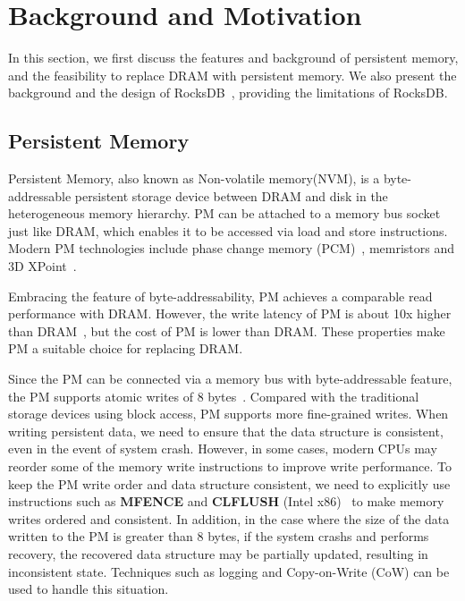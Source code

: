 \section{Background and Motivation}
In this section, we first discuss the features and background of persistent memory, and the feasibility to replace DRAM with persistent memory. We also present the background and the design of RocksDB~\cite{RocksDB}, providing the limitations of RocksDB.
\subsection{Persistent Memory}
Persistent Memory, also known as Non-volatile memory(NVM), is a byte-addressable persistent storage device between DRAM and disk in the heterogeneous memory hierarchy. PM can be attached to a memory bus socket just like DRAM, which enables it to be accessed via load and store instructions. Modern PM technologies include phase change memory (PCM)~\cite{PCM}, memristors and 3D XPoint~\cite{3DXPoint}.

Embracing the feature of byte-addressability, PM achieves a comparable read performance with DRAM. However, the write latency of PM is about 10x higher than DRAM~\cite{DBLP:conf/usenix/XiaJXS17}, but the cost of PM is lower than DRAM. These properties make PM a suitable choice for replacing DRAM.

Since the PM can be connected via a memory bus with byte-addressable feature, the PM supports atomic writes of 8 bytes~\cite{DBLP:conf/fast/LeeLSNN17}. Compared with the traditional storage devices using block access, PM supports more fine-grained writes. When writing persistent data, we need to ensure that the data structure is consistent, even in the event of system crash. However, in some cases, modern CPUs may reorder some of the memory write instructions to improve write performance. To keep the PM write order and data structure consistent, we need to explicitly use instructions such as \textbf{MFENCE} and \textbf{CLFLUSH} (Intel x86)~\cite{SLMDB,DBLP:conf/fast/LeeLSNN17,DBLP:conf/usenix/KannanBGAA18} to make memory writes ordered and consistent. In addition, in the case where the size of the data written to the PM is greater than 8 bytes, if the system crashs and performs recovery, the recovered data structure may be partially updated, resulting in inconsistent state. Techniques such as logging and Copy-on-Write (CoW) can be used to handle this situation.


